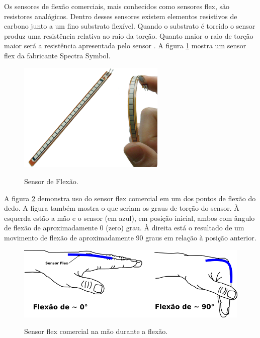 \documentclass[
	12pt,				%
	openright,			%
	oneside,			%
	a4paper,			%
	english,			%
	brazil				%
	]{abntex2}
\begin{document}
		Os sensores de flexão comerciais, mais conhecidos como sensores flex, são resistores analógicos. Dentro desses sensores existem elementos resistivos de carbono junto a um fino substrato flexível. Quando o substrato é torcido o sensor produz uma resistência relativa ao raio da torção. Quanto maior o raio de torção maior será a resistência apresentada pelo sensor \cite{solanki2013sign}. A figura \ref{Fig:flex-sensor1} mostra um sensor flex da fabricante Spectra Symbol.

	\begin{figure}[!h]
		\centering
		\caption{Sensor de Flexão.}
		\includegraphics[width=7cm,keepaspectratio=true]{./figures/flex-sensor1.png}
		\label{Fig:flex-sensor1}
	\end{figure}


		A figura \ref{Fig:hand-flexsensor-degrees1} demonstra uso do sensor flex comercial em um dos pontos de flexão do dedo. A figura também mostra o que seriam os graus de torção do sensor. À esquerda estão a mão e o sensor (em azul), em posição inicial, ambos com ângulo de flexão de aproximadamente 0 (zero) grau. À direita está o resultado de um movimento de flexão de aproximadamente 90 graus em relação à posição anterior.


	\begin{figure}[!h]
		\centering
		\caption{Sensor flex comercial na mão durante a flexão.}
		\includegraphics[width=13cm,keepaspectratio=true]{./figures/hand-flexsensor-degrees1.png}
		\label{Fig:hand-flexsensor-degrees1}
	\end{figure}
\end{document}
